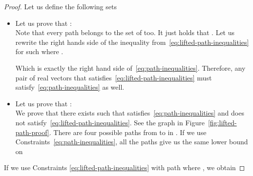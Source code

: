 \documentclass{article}
\begin{document}
\begin{proof}
Let us define the following sets

\begin{itemize}
\item Let us prove that :\\
Note that every path  belongs to the set of  too. It just holds that . 
Let us rewrite the right hands side of the inequality from~\eqref{eq:lifted-path-inequalities} for such   where . 

Which is exactly the right hand side of~\eqref{eq:path-inequalities}. Therefore, any pair of real vectors  that satisfies~\eqref{eq:lifted-path-inequalities} must satisfy~\eqref{eq:path-inequalities} as well.



\item Let us prove that :\\
We prove that there exists  such that  satisfies~\eqref{eq:path-inequalities} and does not satisfy~\eqref{eq:lifted-path-inequalities}. See the graph in Figure~\ref{fig:lifted-path-proof}. There are four possible paths from  to  in . If we use Constraints~\eqref{eq:path-inequalities}, all the paths give us the same lower bound on 

\end{itemize}
If we use Constraints \eqref{eq:lifted-path-inequalities} with path  where , we obtain

\end{proof}
\end{document}

